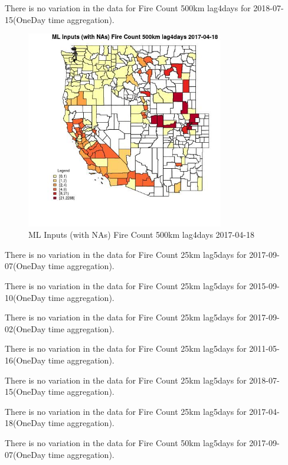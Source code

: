 There is no variation in the data for Fire Count 500km lag4days for 2018-07-15(OneDay time aggregation). 
 

\begin{figure} 
\centering  
\includegraphics[width=0.77\textwidth]{Code_Outputs/Report_ML_input_PM25_Step4_part_e_de_duplicated_aves_compiled_2019-05-21wNAs_CountyFire_Count_500km_lag4daysMean2017-04-18.jpg} 
\caption{\label{fig:Report_ML_input_PM25_Step4_part_e_de_duplicated_aves_compiled_2019-05-21wNAsCountyFire_Count_500km_lag4daysMean2017-04-18}ML Inputs (with NAs) Fire Count 500km lag4days 2017-04-18} 
\end{figure} 
 

There is no variation in the data for Fire Count 25km lag5days for 2017-09-07(OneDay time aggregation). 
 

There is no variation in the data for Fire Count 25km lag5days for 2015-09-10(OneDay time aggregation). 
 

There is no variation in the data for Fire Count 25km lag5days for 2017-09-02(OneDay time aggregation). 
 

There is no variation in the data for Fire Count 25km lag5days for 2011-05-16(OneDay time aggregation). 
 

There is no variation in the data for Fire Count 25km lag5days for 2018-07-15(OneDay time aggregation). 
 

There is no variation in the data for Fire Count 25km lag5days for 2017-04-18(OneDay time aggregation). 
 

There is no variation in the data for Fire Count 50km lag5days for 2017-09-07(OneDay time aggregation). 
 

